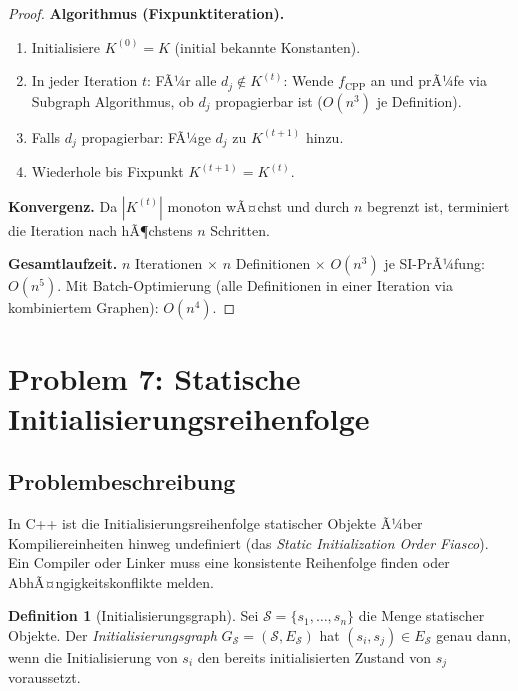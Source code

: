 ﻿\documentclass[a4paper,12pt]{article}
\theoremstyle{definition}
\newtheorem{definition}{Definition}
\begin{document}
\begin{proof}
\textbf{Algorithmus (Fixpunktiteration).}
\begin{enumerate}
    \item Initialisiere $K^{(0)} = K$ (initial bekannte Konstanten).
    \item In jeder Iteration $t$: FÃ¼r alle $d_j \notin K^{(t)}$: Wende $f_{\text{CPP}}$ an und prÃ¼fe via Subgraph Algorithmus, ob $d_j$ propagierbar ist ($O(n^3)$ je Definition).
    \item Falls $d_j$ propagierbar: FÃ¼ge $d_j$ zu $K^{(t+1)}$ hinzu.
    \item Wiederhole bis Fixpunkt $K^{(t+1)} = K^{(t)}$.
\end{enumerate}

\textbf{Konvergenz.} Da $|K^{(t)}|$ monoton wÃ¤chst und durch $n$ begrenzt ist, terminiert die Iteration nach hÃ¶chstens $n$ Schritten.

\textbf{Gesamtlaufzeit.} $n$ Iterationen $\times$ $n$ Definitionen $\times$ $O(n^3)$ je SI-PrÃ¼fung: $O(n^5)$. Mit Batch-Optimierung (alle Definitionen in einer Iteration via kombiniertem Graphen): $O(n^4)$.
\end{proof}

\section{Problem 7: Statische Initialisierungsreihenfolge}
\label{sec:init}

\subsection{Problembeschreibung}

In C++ ist die Initialisierungsreihenfolge statischer Objekte Ã¼ber Kompiliereinheiten hinweg undefiniert (das \emph{Static Initialization Order Fiasco}). Ein Compiler oder Linker muss eine konsistente Reihenfolge finden oder AbhÃ¤ngigkeitskonflikte melden.

\begin{definition}[Initialisierungsgraph]
\label{def:ig2}
Sei $\mathcal{S} = \{s_1, \ldots, s_n\}$ die Menge statischer Objekte. Der \emph{Initialisierungsgraph} $G_{\mathcal{S}} = (\mathcal{S}, E_{\mathcal{S}})$ hat $(s_i, s_j) \in E_{\mathcal{S}}$ genau dann, wenn die Initialisierung von $s_i$ den bereits initialisierten Zustand von $s_j$ voraussetzt.
\end{definition}
\end{document}

